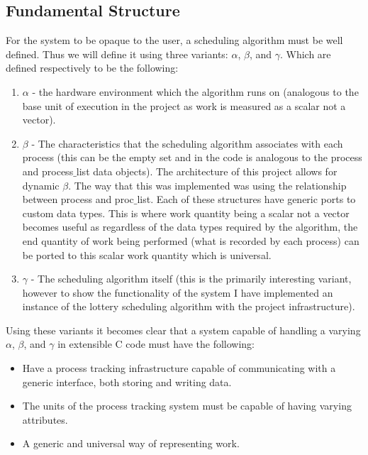 \documentclass[acmsmall]{acmart}
\begin{document}
\begin{multicols}{2}
    \subsection{Fundamental Structure}
    For the system to be opaque to the user, a scheduling algorithm must be
    well defined. Thus we will define it using three variants: $\alpha$,
    $\beta$, and $\gamma$. Which are defined respectively to be the following:
    \begin{enumerate}
      \item $\alpha$ - the hardware environment which the algorithm runs on
        (analogous to the base unit of execution in the project as work is
        measured as a scalar not a vector).
      \item $\beta$ - The characteristics that the scheduling algorithm
        associates with each process (this can be the empty set and in the code
        is analogous to the process and process$\_$list data objects). The
        architecture of this project allows for dynamic $\beta$. The way that
        this was implemented was using the relationship between process and
        proc$\_$list. Each of these structures have generic ports to custom data
        types. This is where work quantity being a scalar not a vector becomes
        useful as regardless of the data types required by the algorithm, the end
        quantity of work being performed (what is recorded by each process) can
        be ported to this scalar work quantity which is universal.
      \item $\gamma$ - The scheduling algorithm itself (this is the primarily
        interesting variant, however to show the functionality of the system I
        have implemented an instance of the lottery scheduling algorithm with
        the project infrastructure).
    \end{enumerate}
    Using these variants it becomes clear that a system capable of handling a
    varying $\alpha$, $\beta$, and $\gamma$ in extensible C code must have
    the following:
    \begin{itemize}
      \item Have a process tracking infrastructure capable of communicating
        with a generic interface, both storing and writing data.
      \item The units of the process tracking system must be capable of having
        varying attributes.
      \item A generic and universal way of representing work.
    \end{itemize}

\end{multicols}
\end{document}
